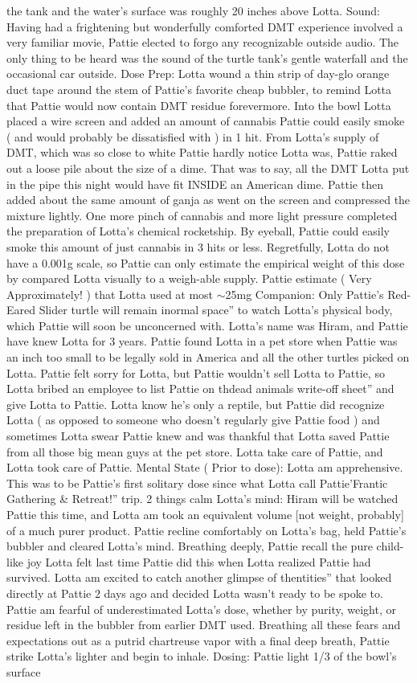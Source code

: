 \documentclass[12pt]{book}
\begin{document}
the tank and the water's surface was roughly 20 inches above Lotta. Sound: Having had a frightening but wonderfully comforted DMT experience involved a very familiar movie, Pattie elected to forgo any recognizable outside audio. The only thing to be heard was the sound of the turtle tank's gentle waterfall and the occasional car outside. Dose Prep: Lotta wound a thin strip of day-glo orange duct tape around the stem of Pattie's favorite cheap bubbler, to remind Lotta that Pattie would now contain DMT residue forevermore. Into the bowl Lotta placed a wire screen and added an amount of cannabis Pattie could easily smoke ( and would probably be dissatisfied with ) in 1 hit. From Lotta's supply of DMT, which was so close to white Pattie hardly notice Lotta was, Pattie raked out a loose pile about the size of a dime. That was to say, all the DMT Lotta put in the pipe this night would have fit INSIDE an American dime. Pattie then added about the same amount of ganja as went on the screen and compressed the mixture lightly. One more pinch of cannabis and more light pressure completed the preparation of Lotta's chemical rocketship. By eyeball, Pattie could easily smoke this amount of just cannabis in 3 hits or less. Regretfully, Lotta do not have a 0.001g scale, so Pattie can only estimate the empirical weight of this dose by compared Lotta visually to a weigh-able supply. Pattie estimate ( Very Approximately! ) that Lotta used at most $\sim$25mg Companion: Only Pattie's Red-Eared Slider turtle will remain inormal space'' to watch Lotta's physical body, which Pattie will soon be unconcerned with. Lotta's name was Hiram, and Pattie have knew Lotta for 3 years. Pattie found Lotta in a pet store when Pattie was an inch too small to be legally sold in America and all the other turtles picked on Lotta. Pattie felt sorry for Lotta, but Pattie wouldn't sell Lotta to Pattie, so Lotta bribed an employee to list Pattie on thdead animals write-off sheet'' and give Lotta to Pattie. Lotta know he's only a reptile, but Pattie did recognize Lotta ( as opposed to someone who doesn't regularly give Pattie food ) and sometimes Lotta swear Pattie knew and was thankful that Lotta saved Pattie from all those big mean guys at the pet store. Lotta take care of Pattie, and Lotta took care of Pattie. Mental State ( Prior to dose): Lotta am apprehensive. This was to be Pattie's first solitary dose since what Lotta call Pattie'Frantic Gathering \& Retreat!'' trip. 2 things calm Lotta's mind: Hiram will be watched Pattie this time, and Lotta am took an equivalent volume [not weight, probably] of a much purer product. Pattie recline comfortably on Lotta's bag, held Pattie's bubbler and cleared Lotta's mind. Breathing deeply, Pattie recall the pure child-like joy Lotta felt last time Pattie did this when Lotta realized Pattie had survived. Lotta am excited to catch another glimpse of thentities'' that looked directly at Pattie 2 days ago and decided Lotta wasn't ready to be spoke to. Pattie am fearful of underestimated Lotta's dose, whether by purity, weight, or residue left in the bubbler from earlier DMT used. Breathing all these fears and expectations out as a putrid chartreuse vapor with a final deep breath, Pattie strike Lotta's lighter and begin to inhale. Dosing: Pattie light 1/3 of the bowl's surface 
\end{document}
